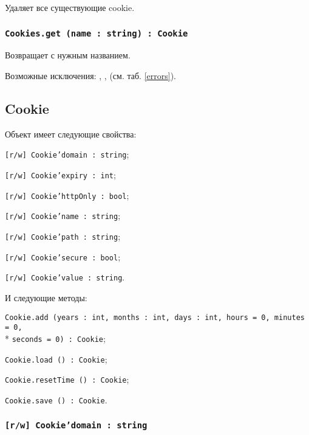 Удаляет все существующие cookie.

\subsubsection{\texttt{Cookies.get (name : string) : Cookie}}

Возвращает \cookie{} с нужным названием.

Возможные исключения: , ,  (см. таб. \ref{errors}).

\subsection{{\color{orange} Cookie}}

Объект \cookie{} имеет следующие свойства:
\begin{icItems}
	\item \texttt{[r/w] Cookie'domain : string};
	\item \texttt{[r/w] Cookie'expiry : int};
	\item \texttt{[r/w] Cookie'httpOnly : bool};
	\item \texttt{[r/w] Cookie'name : string};
	\item \texttt{[r/w] Cookie'path : string};
	\item \texttt{[r/w] Cookie'secure : bool};
	\item \texttt{[r/w] Cookie'value : string}.
\end{icItems}

И следующие методы:
\begin{icItems}
	\item \texttt{Cookie.add (years : int, months : int, days : int, hours = 0, minutes = 0,}\\* \texttt{seconds = 0) : Cookie};
	\item \texttt{Cookie.load () : Cookie};
	\item \texttt{Cookie.resetTime () : Cookie};
	\item \texttt{Cookie.save () : Cookie}.
\end{icItems}

\subsubsection{\texttt{[r/w] Cookie'domain : string}}

